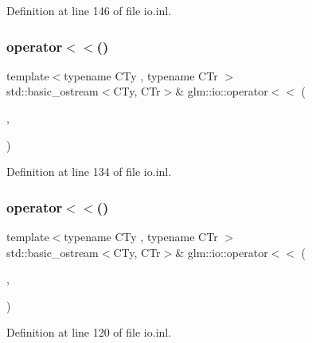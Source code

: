 Definition at line 146 of file io.\+inl.

\mbox{\label{namespaceglm_1_1io_a296b3e794144975434f9419d1b293ed5}} 
\subsubsection{\texorpdfstring{operator$<$$<$()}{operator<<()}\hspace{0.1cm}{\footnotesize\ttfamily [5/8]}}
{\footnotesize\ttfamily template$<$typename C\+Ty , typename C\+Tr $>$ \\
std\+::basic\+\_\+ostream$<$C\+Ty, C\+Tr$>$\& glm\+::io\+::operator$<$$<$ (\begin{DoxyParamCaption}\item[{std\+::basic\+\_\+ostream$<$ C\+Ty, C\+Tr $>$ \&}]{,  }\item[{\mbox{\hyperlink{structglm_1_1io_1_1delimeter}{delimeter}}$<$ C\+Ty $>$ const \&}]{ }\end{DoxyParamCaption})}



Definition at line 134 of file io.\+inl.

\mbox{\label{namespaceglm_1_1io_aa5761ee427320d2121a97a7450256e3b}} 
\subsubsection{\texorpdfstring{operator$<$$<$()}{operator<<()}\hspace{0.1cm}{\footnotesize\ttfamily [6/8]}}
{\footnotesize\ttfamily template$<$typename C\+Ty , typename C\+Tr $>$ \\
std\+::basic\+\_\+ostream$<$C\+Ty, C\+Tr$>$\& glm\+::io\+::operator$<$$<$ (\begin{DoxyParamCaption}\item[{std\+::basic\+\_\+ostream$<$ C\+Ty, C\+Tr $>$ \&}]{,  }\item[{\mbox{\hyperlink{structglm_1_1io_1_1precision}{precision}} const \&}]{ }\end{DoxyParamCaption})}



Definition at line 120 of file io.\+inl.

